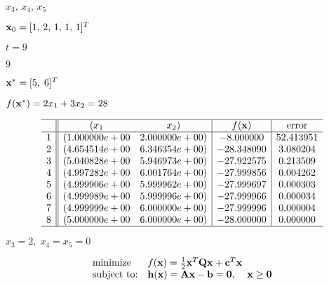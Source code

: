\documentclass{article}
\def\lthtmlcheckvsize{\ifdim\ht\sizebox<\vsize 
  \ifdim\wd\sizebox<\hsize\expandafter\hfill\fi \expandafter\vfill
  \else\expandafter\vss\fi}%
\begin{document}
{\newpage\clearpage
{}%
$ x_3,\,x_4,\,x_5$%
\lthtmlindisplaymathZ
\lthtmlcheckvsize\clearpage}

{\newpage\clearpage
{}%
$ {\bf x}_0=[1,\,2,\,1,\,1,\,1]^T$%
\lthtmlindisplaymathZ
\lthtmlcheckvsize\clearpage}

{\newpage\clearpage
{}%
$ t=9$%
\lthtmlindisplaymathZ
\lthtmlcheckvsize\clearpage}

{\newpage\clearpage
{}%
$ 9$%
\lthtmlindisplaymathZ
\lthtmlcheckvsize\clearpage}

{\newpage\clearpage
{}%
$ {\bf x}^*=[5,\;6]^T$%
\lthtmlindisplaymathZ
\lthtmlcheckvsize\clearpage}

{\newpage\clearpage
{}%
$ f({\bf x}^*)=2x_1+3x_2=28$%
\lthtmlindisplaymathZ
\lthtmlcheckvsize\clearpage}

{\newpage\clearpage
{}%
\begin{displaymath}\begin{array}{c|| c c| c | c}\hline
& (x_1 & x_2) & f({\bf x}) & \mbox{error} \\\hline
1 & (1.000000e+00 & 2.000000e+00) &  -8.000000	& 52.413951 \\
2 & (4.654514e+00 & 6.346354e+00) & -28.348090	& 3.080204 \\
3 & (5.040828e+00 & 5.946973e+00) & -27.922575	& 0.213509 \\
4 & (4.997282e+00 & 6.001764e+00) & -27.999856	& 0.004262 \\
5 & (4.999906e+00 & 5.999962e+00) & -27.999697	& 0.000303 \\
6 & (4.999989e+00 & 5.999996e+00) & -27.999966	& 0.000034 \\
7 & (4.999999e+00 & 6.000000e+00) & -27.999996	& 0.000004 \\
8 & (5.000000e+00 & 6.000000e+00) & -28.000000	& 0.000000 \\\hline
\end{array}\end{displaymath}%
\lthtmldisplayZ
\lthtmlcheckvsize\clearpage}

{\newpage\clearpage
{}%
$ x_3=2,\;x_4=x_5=0$%
\lthtmlindisplaymathZ
\lthtmlcheckvsize\clearpage}

{\newpage\clearpage
{}%
\begin{displaymath}\begin{array}{ll}
\mbox{minimize}    &
f({\bf x})=\frac{1}{2}{\bf x}^T{\bf Q}{\bf x}+{\bf c}^T{\bf x}\\
\mbox{subject to:} & {\bf h}({\bf x})={\bf A}{\bf x}-{\bf b}={\bf0},
\;\;\;\;{\bf x}\ge{\bf0}
\end{array}\end{displaymath}%
\lthtmldisplayZ
\lthtmlcheckvsize\clearpage}
\end{document}
